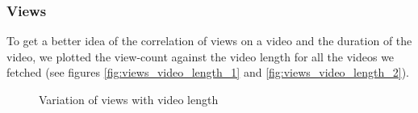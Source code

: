 \documentclass{article}
\begin{document}
\subsubsection{Views}
To get a better idea of the correlation of views on a video and the duration of the video, we plotted the view-count against the video length for all the videos we fetched (see figures \ref{fig:views_video_length_1} and \ref{fig:views_video_length_2}). 

\begin{figure}[!htpb]
    \centering
     \hspace{-2em}%
    \qquad
    
    \caption{Variation of views with video length}%
\end{figure}
\FloatBarrier

\end{document}
